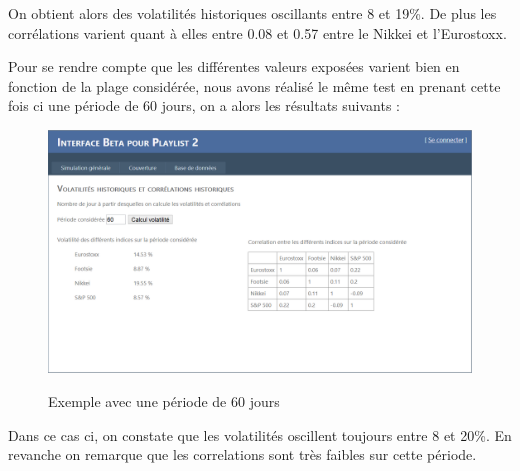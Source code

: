 \documentclass[french,12pt,a4paper]{article}
\begin{document}
On obtient alors des volatilités historiques oscillants entre 8 et 19\%. De plus les corrélations varient quant à elles entre 0.08 et 0.57 entre le Nikkei et l'Eurostoxx.

Pour se rendre compte que les différentes valeurs exposées varient bien en fonction de la plage considérée, nous avons réalisé le même test en prenant cette fois ci une période de 60 jours, on a alors les résultats suivants :

\begin{center}
\begin{figure}[h!]
    \caption{Exemple avec une période de 60 jours}
    \includegraphics[scale=0.45]{Manuel1.png}
    \label{fig:PropProf}
\end{figure}
\end{center} 

Dans ce cas ci, on constate que les volatilités oscillent toujours entre 8 et 20\%. En revanche on remarque que les correlations sont très faibles sur cette période. 
\end{document}
